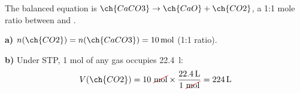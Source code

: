 \documentclass[11pt,a4paper]{article}
\begin{document}
\begin{solucioneng}
The balanced equation is $\ch{CaCO3} \rightarrow \ch{CaO} + \ch{CO2}$, a 1:1 mole ratio between  and .

\textbf{a)} $n(\ch{CO2}) = n(\ch{CaCO3}) = \qty{10}{\mole}$ (1:1 ratio).

\textbf{b)} Under STP, 1 mol of any gas occupies \qty{22.4}{\litre}:
\begin{equation*}
    V(\ch{CO2}) = 10\ \cancelred{\unit{\mole}} \times \dfrac{\qty{22.4}{\litre}}{1\ \cancelred{\unit{\mole}}} = \qty{224}{\litre}
\end{equation*}
\end{solucioneng}
\end{document}
